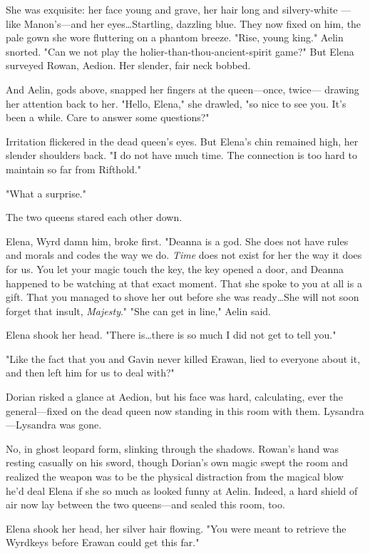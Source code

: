 She was exquisite: her face young and grave, her hair long and silvery-white ---like Manon's---and her eyes\ldots Startling, dazzling blue.
They now fixed on him, the pale gown she wore fluttering on a phantom breeze.
"Rise, young king."
Aelin snorted.
"Can we not play the holier-than-thou-ancient-spirit game?"
But Elena surveyed Rowan, Aedion.
Her slender, fair neck bobbed.

And Aelin, gods above, snapped her fingers at the queen---once, twice--- drawing her attention back to her.
"Hello, Elena," she drawled, "so nice to see you.
It's been a while.
Care to answer some questions?"

Irritation flickered in the dead queen's eyes.
But Elena's chin remained high, her slender shoulders back.
"I do not have much time.
The connection is too hard to maintain so far from Rifthold."

"What a surprise."

The two queens stared each other down.

Elena, Wyrd damn him, broke first.
"Deanna is a god.
She does not have rules and morals and codes the way we do.
\emph{Time} does not exist for her the way it does for us.
You let your magic touch the key, the key opened a door, and Deanna happened to be watching at that exact moment.
That she spoke to you at all is a gift.
That you managed to shove her out before she was ready\ldots She will not soon forget that insult,
\emph{Majesty}."
"She can get in line," Aelin said.

Elena shook her head.
"There is\ldots there is so much I did not get to tell you."

"Like the fact that you and Gavin never killed Erawan, lied to everyone about it, and then left him for us to deal with?"

Dorian risked a glance at Aedion, but his face was hard, calculating, ever the general---fixed on the dead queen now standing in this room with them.
Lysandra---Lysandra was gone.

No, in ghost leopard form, slinking through the shadows.
Rowan's hand was resting casually on his sword, though Dorian's own magic swept the room and realized the weapon was to be the physical distraction from the magical blow he'd deal Elena if she so much as looked funny at Aelin.
Indeed, a hard shield of air now lay between the two queens---and sealed this room, too.

Elena shook her head, her silver hair flowing.
"You were meant to retrieve the Wyrdkeys before Erawan could get this far."

